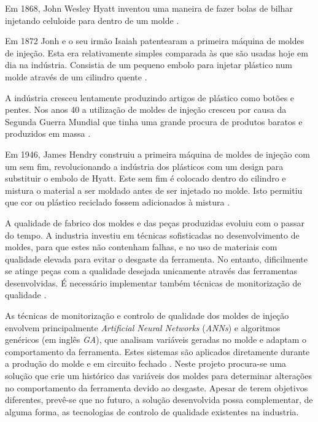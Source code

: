 \documentclass[11pt,twoside,a4paper]{report}
\begin{document}
Em 1868, John Wesley Hyatt inventou uma maneira de fazer bolas de bilhar injetando celuloide para dentro de um molde \cite{historia,patente1868}.\par
Em 1872 Jonh e o seu irmão Isaiah patentearam a primeira máquina de moldes de injeção. Esta era relativamente simples comparada às que são usadas hoje em dia na indústria. Consistia de um pequeno embolo para injetar plástico num molde através de um cilindro quente \cite{historia,patente1872}.\par
A indústria cresceu lentamente produzindo artigos de plástico como botões e pentes. Nos anos 40 a utilização de moldes de injeção cresceu por causa da Segunda Guerra Mundial que tinha uma grande procura de produtos baratos e produzidos em massa \cite{historia}.\par
Em 1946, James Hendry construiu a primeira máquina de moldes de injeção com um sem fim, revolucionando a indústria dos plásticos com um design para substituir o embolo de Hyatt. Este sem fim é colocado dentro do cilindro e mistura o material a ser moldado antes de ser injetado no molde. Isto permitiu que cor ou plástico reciclado fossem adicionados à mistura \cite{historia,patente1946}.\par
A qualidade de fabrico dos moldes e das peças produzidas evoluiu com o passar do tempo. A industria investiu em técnicas sofisticadas no desenvolvimento de moldes, para que estes não contenham falhas, e no uso de materiais com qualidade elevada para evitar o desgaste da ferramenta. No entanto, dificilmente se atinge peças com a qualidade desejada unicamente através das ferramentas desenvolvidas. É necessário implementar também técnicas de monitorização de qualidade \cite{Woll}.\par 
As técnicas de monitorização e controlo de qualidade dos moldes de injeção envolvem principalmente \textit{Artificial Neural Networks} (\textit{ANNs}) e algoritmos genéricos (em inglês \textit{GA}), que analisam variáveis geradas no molde e adaptam o comportamento da ferramenta. Estes sistemas são aplicados diretamente durante a produção do molde e em circuito fechado \cite{Cook,Woll}. Neste projeto procura-se uma solução que crie um histórico das variáveis dos moldes para determinar alterações no comportamento da ferramenta devido ao desgaste. Apesar de terem objetivos diferentes, prevê-se que no futuro, a solução desenvolvida possa complementar, de alguma forma, as tecnologias de controlo de qualidade existentes na industria.
\end{document}
